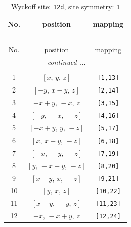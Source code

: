 \documentclass[fleqn,8pt]{jsarticle}
\begin{document}
\renewcommand{\arraystretch}{1.2}
\begin{longtable}{ccc}
\caption{Wyckoff site: {\tt 12d}, site symmetry: {\tt 1}}
 \\
 \hline \hline
No. & position & mapping \\ \hline \endfirsthead

\multicolumn{2}{l}{\tablename\ \thetable{}} \\
 \hline \hline
No. & position & mapping \\ \hline \endhead

 \hline \hline
\multicolumn{2}{r}{\footnotesize\it continued ...} \\ \endfoot

 \hline \hline
\multicolumn{2}{r}{} \\ \endlastfoot

1 & $\left[ x,\, y,\, z \right]$ & {\tt [1,13]} \\ \hline
2 & $\left[ - y,\, x - y,\, z \right]$ & {\tt [2,14]} \\ \hline
3 & $\left[ - x + y,\, - x,\, z \right]$ & {\tt [3,15]} \\ \hline
4 & $\left[ - y,\, - x,\, - z \right]$ & {\tt [4,16]} \\ \hline
5 & $\left[ - x + y,\, y,\, - z \right]$ & {\tt [5,17]} \\ \hline
6 & $\left[ x,\, x - y,\, - z \right]$ & {\tt [6,18]} \\ \hline
7 & $\left[ - x,\, - y,\, - z \right]$ & {\tt [7,19]} \\ \hline
8 & $\left[ y,\, - x + y,\, - z \right]$ & {\tt [8,20]} \\ \hline
9 & $\left[ x - y,\, x,\, - z \right]$ & {\tt [9,21]} \\ \hline
10 & $\left[ y,\, x,\, z \right]$ & {\tt [10,22]} \\ \hline
11 & $\left[ x - y,\, - y,\, z \right]$ & {\tt [11,23]} \\ \hline
12 & $\left[ - x,\, - x + y,\, z \right]$ & {\tt [12,24]} \\
\end{longtable}
\end{document}
